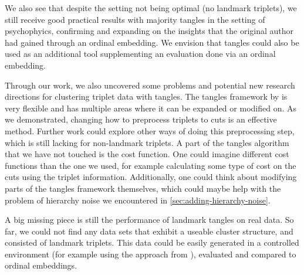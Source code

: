 We also see that despite the setting not being optimal (no landmark triplets), we still receive good practical results with majority tangles in the setting of psychophyics, 
confirming and expanding on the insights that the original author had gained through an ordinal embedding. We envision that tangles could also be used as an additional tool supplementing an evaluation done via an ordinal embedding. 

Through our work, we also uncovered some problems and potential new research directions for clustering triplet data with tangles. 
The tangles framework by \cite{klepperClusteringTanglesAlgorithmic2021} is very flexible and has multiple areas where it can be expanded or modified on. As we demonstrated, changing how to 
preprocess triplets to cuts is an effective method. Further work could explore other ways of doing this preprocessing step, which is still lacking for non-landmark triplets. 
A part of the tangles algorithm that we have not touched is the cost function. One could imagine different cost functions than the one we used, for example calculating some 
type of cost on the cuts using the triplet information. Additionally, one could think about modifying parts of the tangles framework themselves, which could maybe help with the problem of 
hierarchy noise we encountered in \autoref{sec:adding-hierarchy-noise}.

A big missing piece is still the performance of landmark tangles on real data. So far, we could not find any data sets that exhibit a useable cluster structure, and consisted of landmark 
triplets. This data could be easily generated in a controlled environment (for example using the approach from \cite{inesschonmannSimilarityJudgementsNatural2021}), evaluated and compared to ordinal embeddings. 

